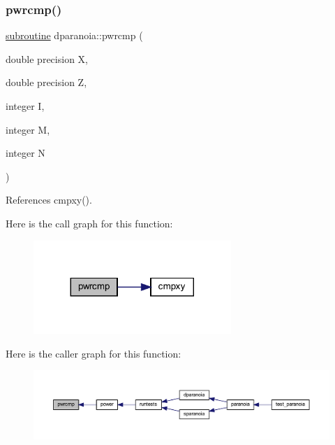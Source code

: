 \subsubsection{\texorpdfstring{pwrcmp()}{pwrcmp()}}
{\footnotesize\ttfamily \hyperlink{M__stopwatch_83_8txt_acfbcff50169d691ff02d4a123ed70482}{subroutine} dparanoia\+::pwrcmp (\begin{DoxyParamCaption}\item[{double precision}]{X,  }\item[{double precision}]{Z,  }\item[{integer}]{I,  }\item[{integer}]{M,  }\item[{integer}]{N }\end{DoxyParamCaption})}



References cmpxy().

Here is the call graph for this function\+:
\nopagebreak
\begin{figure}[H]
\begin{center}
\leavevmode
\includegraphics[width=212pt]{dparanoia_8f90_a99ac19051998d16ab21240c6ea92efa9_cgraph}
\end{center}
\end{figure}
Here is the caller graph for this function\+:
\nopagebreak
\begin{figure}[H]
\begin{center}
\leavevmode
\includegraphics[width=350pt]{dparanoia_8f90_a99ac19051998d16ab21240c6ea92efa9_icgraph}
\end{center}
\end{figure}
\mbox{\label{dparanoia_8f90_ae90ce15b8c2d18156d500ae21387764d}} 
